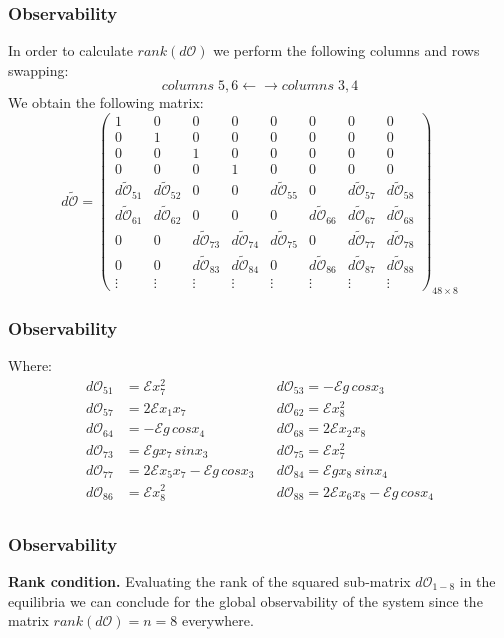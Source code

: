 %
\begin{frame}
\frametitle{Observability}
In order to calculate $rank(d\mathcal{O})$ we perform the following columns and rows swapping:
\begin{equation*}
columns\;5,6 \leftarrow\rightarrow columns\;3,4
\end{equation*}
We obtain the following matrix:
\begin{equation*}
	d\tilde{\mathcal{O}} =%
	\begin{pmatrix}
		1 &0 &0 &0 &0 &0 &0 &0 \\
		0 &1 &0 &0 &0 &0 &0 &0 \\
		0 &0 &1 &0 &0 &0 &0 &0 \\
		0 &0 &0 &1 &0 &0 &0 &0 \\
	    d\tilde{\mathcal{O}}_{51} &d\tilde{\mathcal{O}}_{52} &0 &0 &d\tilde{\mathcal{O}}_{55} &0 &d\tilde{\mathcal{O}}_{57} &d\tilde{\mathcal{O}}_{58} \\
		d\tilde{\mathcal{O}}_{61} &d\tilde{\mathcal{O}}_{62} &0 &0 &0 &d\tilde{\mathcal{O}}_{66} &d\tilde{\mathcal{O}}_{67} &d\tilde{\mathcal{O}}_{68} \\
		0 &0 &d\tilde{\mathcal{O}}_{73} &d\tilde{\mathcal{O}}_{74} &d\tilde{\mathcal{O}}_{75} &0 &d\tilde{\mathcal{O}}_{77} &d\tilde{\mathcal{O}}_{78} \\
		0 &0 &d\tilde{\mathcal{O}}_{83} &d\tilde{\mathcal{O}}_{84} &0 &d\tilde{\mathcal{O}}_{86} &d\tilde{\mathcal{O}}_{87} &d\tilde{\mathcal{O}}_{88} \\
		\vdots &\vdots &\vdots &\vdots &\vdots &\vdots &\vdots &\vdots
	\end{pmatrix}_{48\times8}
\end{equation*}

\end{frame}
%
\begin{frame}
\frametitle{Observability}
Where:
\begin{align*}
d\mathcal{O}_{51} &=\mathcal{E}x^2_7 \nonumber &&
d\mathcal{O}_{53} =-\mathcal{E}g\,cosx_3 \nonumber \\
d\mathcal{O}_{57} &=2\mathcal{E}x_1x_7 \nonumber &&
d\mathcal{O}_{62} =\mathcal{E}x^2_8 \nonumber \\
d\mathcal{O}_{64} &=-\mathcal{E}g\,cosx_4 \nonumber &&
d\mathcal{O}_{68} =2\mathcal{E}x_2x_8 \nonumber \\
d\mathcal{O}_{73} &=\mathcal{E}gx_7\,sinx_3 \nonumber &&
d\mathcal{O}_{75} =\mathcal{E}x^2_7 \nonumber \\
d\mathcal{O}_{77} &=2\mathcal{E}x_5x_7 - \mathcal{E}g\,cosx_3 \nonumber &&
d\mathcal{O}_{84} =\mathcal{E}gx_8\,sinx_4 \nonumber \\
d\mathcal{O}_{86} &=\mathcal{E}x^2_8 \nonumber &&
d\mathcal{O}_{88} =2\mathcal{E}x_6x_8 - \mathcal{E}g\,cosx_4 \nonumber \\
\end{align*}
\end{frame}
%
\begin{frame}
\frametitle{Observability}
\textbf{Rank condition.} Evaluating the rank of the squared sub-matrix $d\mathcal{O}_{1-8}$ in the equilibria we can conclude for the global observability of the system since the matrix $rank(d\mathcal{O}) = n = 8$ everywhere.
\end{frame}
%
